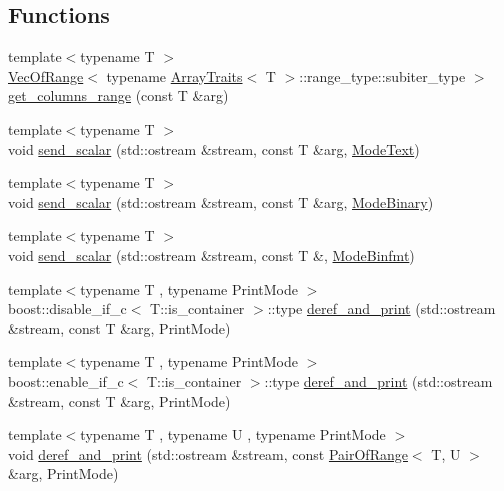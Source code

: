 \subsection*{Functions}
\begin{DoxyCompactItemize}
\item 
{\footnotesize template$<$typename T $>$ }\\\hyperlink{classgnuplotio_1_1_vec_of_range}{Vec\+Of\+Range}$<$ typename \hyperlink{classgnuplotio_1_1_array_traits}{Array\+Traits}$<$ T $>$\+::range\+\_\+type\+::subiter\+\_\+type $>$ \hyperlink{namespacegnuplotio_a64984827dd8debb9098ad1afdde8e409}{get\+\_\+columns\+\_\+range} (const T \&arg)
\item 
{\footnotesize template$<$typename T $>$ }\\void \hyperlink{namespacegnuplotio_a55ff2f9abaa4b3e1c64a8f730f791b33}{send\+\_\+scalar} (std\+::ostream \&stream, const T \&arg, \hyperlink{structgnuplotio_1_1_mode_text}{Mode\+Text})
\item 
{\footnotesize template$<$typename T $>$ }\\void \hyperlink{namespacegnuplotio_a05022d6e136d8ed89a2bef0f61443332}{send\+\_\+scalar} (std\+::ostream \&stream, const T \&arg, \hyperlink{structgnuplotio_1_1_mode_binary}{Mode\+Binary})
\item 
{\footnotesize template$<$typename T $>$ }\\void \hyperlink{namespacegnuplotio_a926e0935a02d83735da2c34cfbad133f}{send\+\_\+scalar} (std\+::ostream \&stream, const T \&, \hyperlink{structgnuplotio_1_1_mode_binfmt}{Mode\+Binfmt})
\item 
{\footnotesize template$<$typename T , typename Print\+Mode $>$ }\\boost\+::disable\+\_\+if\+\_\+c$<$ T\+::is\+\_\+container $>$\+::type \hyperlink{namespacegnuplotio_a66d64f716e539dc233f8183b4ce71c09}{deref\+\_\+and\+\_\+print} (std\+::ostream \&stream, const T \&arg, Print\+Mode)
\item 
{\footnotesize template$<$typename T , typename Print\+Mode $>$ }\\boost\+::enable\+\_\+if\+\_\+c$<$ T\+::is\+\_\+container $>$\+::type \hyperlink{namespacegnuplotio_a8c6b699dd18c419d597a008b74eda41a}{deref\+\_\+and\+\_\+print} (std\+::ostream \&stream, const T \&arg, Print\+Mode)
\item 
{\footnotesize template$<$typename T , typename U , typename Print\+Mode $>$ }\\void \hyperlink{namespacegnuplotio_acd0cb4bd9679f0b75bac15c8afcc10e6}{deref\+\_\+and\+\_\+print} (std\+::ostream \&stream, const \hyperlink{classgnuplotio_1_1_pair_of_range}{Pair\+Of\+Range}$<$ T, U $>$ \&arg, Print\+Mode)

\end{DoxyCompactItemize}
